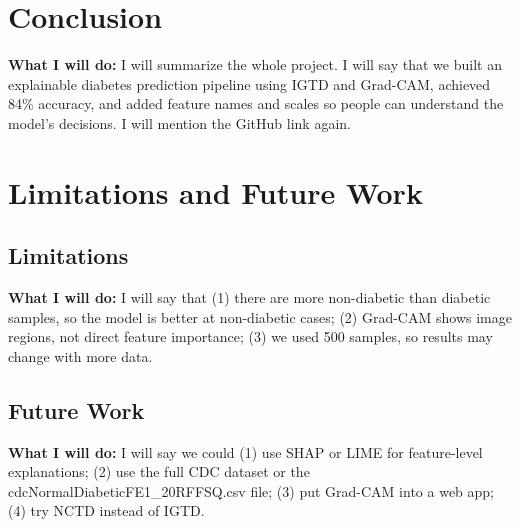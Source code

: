 \documentclass[12pt]{dalthesis}
\begin{document}

\chapter{Conclusion}\label{ch:conclusion}

\textbf{What I will do:} I will summarize the whole project. I will say that we built an explainable diabetes prediction pipeline using IGTD and Grad-CAM, achieved 84\% accuracy, and added feature names and scales so people can understand the model's decisions. I will mention the GitHub link again.


\chapter{Limitations and Future Work}

\section{Limitations}

\textbf{What I will do:} I will say that (1) there are more non-diabetic than diabetic samples, so the model is better at non-diabetic cases; (2) Grad-CAM shows image regions, not direct feature importance; (3) we used 500 samples, so results may change with more data.


\section{Future Work}

\textbf{What I will do:} I will say we could (1) use SHAP or LIME for feature-level explanations; (2) use the full CDC dataset or the cdcNormalDiabeticFE1\_20RFFSQ.csv file; (3) put Grad-CAM into a web app; (4) try NCTD instead of IGTD.

\end{document}
